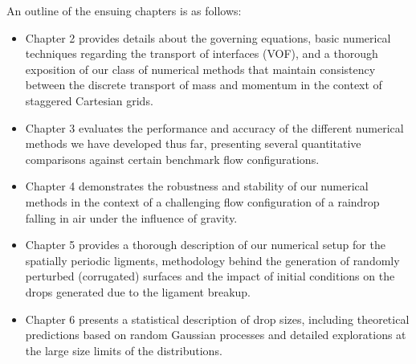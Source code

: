 \newpage

An outline of the ensuing chapters is as follows: 

\begin{itemize}
	\item Chapter 2 provides details about the governing equations, basic numerical techniques
		regarding the transport of interfaces (VOF), and a thorough exposition of our class 
		of numerical methods that maintain consistency between the discrete transport of mass
		and momentum in the context of staggered Cartesian grids.
	\item Chapter 3 evaluates the performance and accuracy of the different numerical methods
		we have developed thus far, presenting several quantitative comparisons 
		against certain benchmark flow configurations.  
	\item Chapter 4 demonstrates the robustness and stability of our numerical methods in the context of a 
		challenging flow configuration of a raindrop falling in air under the influence of gravity.
	\item Chapter 5 provides a thorough description of our numerical setup for the spatially periodic
		ligments, methodology behind the generation of randomly perturbed (corrugated) surfaces 
		and the impact of initial conditions on the drops generated due to the ligament breakup.
	\item Chapter 6 presents a statistical description of drop sizes, including theoretical predictions 
		based on random Gaussian processes and detailed explorations at the large size limits of the distributions.  
\end{itemize}




















































